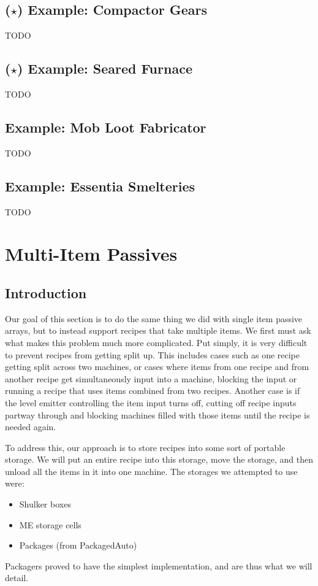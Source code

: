 \documentclass{notes}
\begin{document}
\subsection{($\star$) Example: Compactor Gears}
TODO

\subsection{($\star$) Example: Seared Furnace}
TODO

\subsection{Example: Mob Loot Fabricator}
TODO

\subsection{Example: Essentia Smelteries}
TODO

\pagebreak
\section{Multi-Item Passives}

\subsection{Introduction}
Our goal of this section is to do the same thing we did with single item passive arrays, but to instead support recipes that take multiple items. We first must ask what makes this problem much more complicated. Put simply, it is very difficult to prevent recipes from getting split up. This includes cases such as one recipe getting split across two machines, or cases where items from one recipe and from another recipe get simultaneously input into a machine, blocking the input or running a recipe that uses items combined from two recipes. Another case is if the level emitter controlling the item input turns off, cutting off recipe inputs partway through and blocking machines filled with those items until the recipe is needed again.

To address this, our approach is to store recipes into some sort of portable storage. We will put an entire recipe into this storage, move the storage, and then unload all the items in it into one machine. The storages we attempted to use were:
\begin{itemize}
    \item Shulker boxes
    \item ME storage cells
    \item Packages (from PackagedAuto)
\end{itemize}
Packagers proved to have the simplest implementation, and are thus what we will detail.
\end{document}
